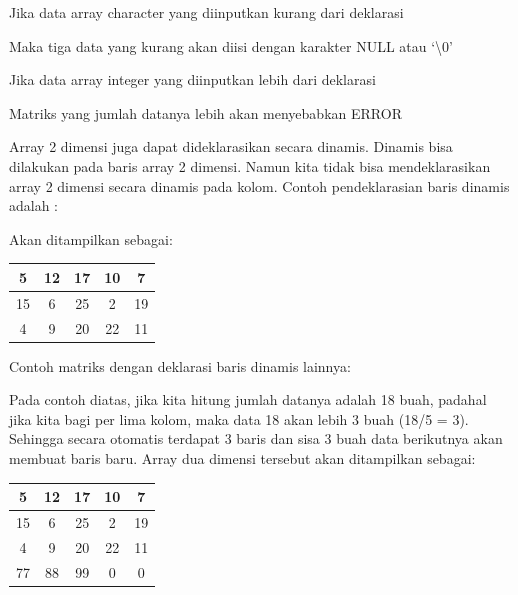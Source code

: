 Jika data array character yang diinputkan kurang dari deklarasi



Maka tiga data yang kurang akan diisi dengan karakter NULL atau `\textbackslash{}0'

Jika data array integer yang diinputkan lebih dari deklarasi



{\LARGE {}} Matriks yang jumlah datanya lebih akan menyebabkan ERROR


\begin{figure}
\centering
{}
\end{figure}




Array 2 dimensi juga dapat dideklarasikan secara dinamis. Dinamis bisa
dilakukan pada baris array 2 dimensi. Namun kita tidak bisa
mendeklarasikan array 2 dimensi secara dinamis pada kolom. Contoh
pendeklarasian baris dinamis adalah :



Akan ditampilkan sebagai:

\begin{tabular}{|c|c|c|c|c|}
\hline
5&12&17&10&7 \\ \hline
15&6&25&2&19 \\ \hline
4&9&20&22&11 \\ \hline
\end{tabular}


Contoh matriks dengan deklarasi baris dinamis lainnya:



Pada contoh diatas, jika kita hitung jumlah datanya adalah 18 buah,
padahal jika kita bagi per lima kolom, maka data 18 akan lebih 3 buah
(18/5 = 3). Sehingga secara otomatis terdapat 3 baris dan sisa 3 buah
data berikutnya akan membuat baris baru. Array dua dimensi tersebut akan
ditampilkan sebagai:


\begin{tabular}{|c|c|c|c|c|}
\hline
5 & 12 & 17 & 10 & 7 \\ \hline
15 & 6 & 25 & 2 & 19 \\ \hline
4 & 9 & 20 & 22 & 11 \\ \hline
77 & 88 & 99 & 0 & 0 \\ \hline

\end{tabular}

